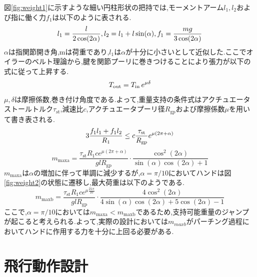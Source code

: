\documentclass{jarticle}
\begin{document}
図\ref{fig:weight1}に示すような細い円柱形状の把持では,モーメントアーム$l_1,l_2$および指に働く力$f_1$は以下のように表される.
\vspace{-2mm}
\begin{equation}
  l_1 = \frac{l}{2\cos(2\alpha)},l_2 = l_1 + l\sin(\alpha),f_1 = \frac{mg}{3\cos(2\alpha)}
  \vspace{-2mm}
  \label{equ:euler}
\end{equation}
$\alpha$は指関節開き角,mは荷重であり,$l_1$は$\alpha$が十分に小さいとして近似した.ここでオイラーのベルト理論\cite{eulerbelt}から,腱を関節プーリに巻きつけることにより張力が以下の式に従って上昇する.
\vspace{-2mm}
\begin{equation}
  T_\text{out} = T_\text{in} \, e^{\mu\delta}
  \vspace{-2mm}
\end{equation}
$\mu,\delta$は摩擦係数,巻き付け角度である.よって,重量支持の条件式はアクチュエータストールトルク$\tau_\text{st}$,減速比$c$,アクチュエータプーリ径$R_\text{gp}$および摩擦係数$\mu$を用いて書き表される.
\vspace{-2mm}
\begin{equation}
  3\frac{f_1l_1 + f_1l_2}{R_1} \leq c \frac{\tau_\text{st}}{R_\text{gp}} e^{\mu(2\pi + \alpha)}
  \vspace{-2mm}
  \label{equ:jouken2}
\end{equation}
\begin{equation}
  m_{\text{maxa}} = \frac{\tau_{\text{st}} R_1 c e^{\mu(2\pi + \alpha)}}{g l R_{\text{gp}}} \cdot \frac{\cos^2(2\alpha)}{\sin(\alpha) \cos(2\alpha) + 1}
  \label{equ:mmaxa}
\end{equation}
$m_\text{maxa}$は$\alpha$の増加に伴って単調に減少するが,$\alpha = \pi/10$においてハンドは図\ref{fig:weight2}の状態に遷移し,最大荷重は以下のようである.
\vspace{-2mm}
\begin{equation}
  m_{\text{maxb}} = \frac{\tau_{\text{st}} R_1 c e^{\mu \frac{21\pi}{10}}}{g l R_{\text{gp}}} \cdot \frac{4 \cos^2(2\alpha)}{4\sin(\alpha)\cos(2\alpha) + 5\cos(2\alpha) - 1}
  \label{equ:mmaxb}
\end{equation}
ここで,$\alpha = \pi / 10$においては$m_\text{maxa} < m_\text{maxb}$であるため,支持可能重量のジャンプが起こると考えられる.よって,実際の設計においては$m_{maxb}$がパーチング過程においてハンドに作用する力を十分に上回る必要がある.
\section{飛行動作設計}
\end{document}

